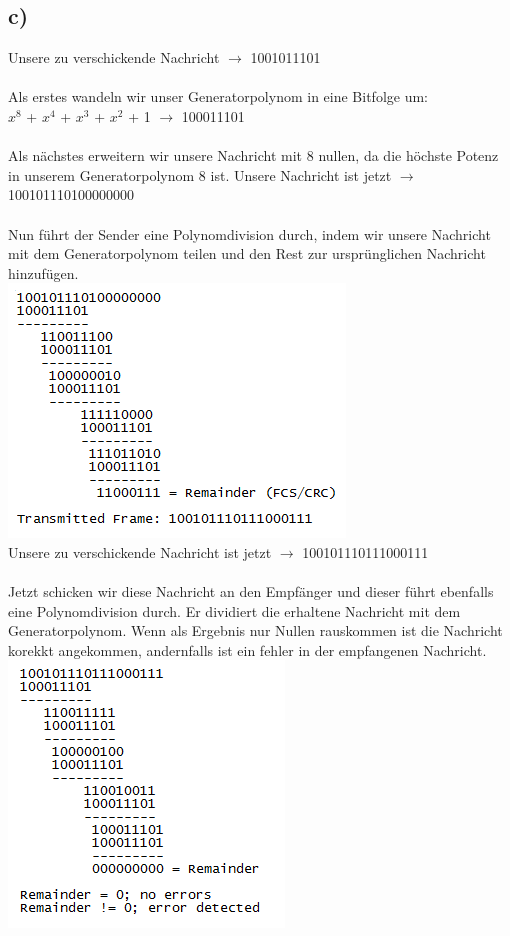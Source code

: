 \documentclass[a4paper,12pt]{scrartcl}
\begin{document}
\subsection{c)}
Unsere zu verschickende Nachricht $\rightarrow$ 1001011101\\\\
Als erstes wandeln wir unser Generatorpolynom in eine Bitfolge um:\\
$x^8$ + $x^4$ + $x^3$ + $x^2$ + 1 $\rightarrow$ 100011101\\\\
Als nächstes erweitern wir unsere Nachricht mit 8 nullen, da die höchste Potenz in unserem Generatorpolynom 8 ist. Unsere Nachricht ist jetzt $\rightarrow$ 100101110100000000\\\\
Nun führt der Sender eine Polynomdivision durch, indem wir unsere Nachricht mit dem Generatorpolynom teilen und den Rest zur ursprünglichen Nachricht hinzufügen.\\
\includegraphics{./images/Aufgabe8c-sender}\\
Unsere zu verschickende Nachricht ist jetzt $\rightarrow$ 100101110111000111\\\\
Jetzt schicken wir diese Nachricht an den Empfänger und dieser führt ebenfalls eine Polynomdivision durch. Er dividiert die erhaltene Nachricht mit dem Generatorpolynom. Wenn als Ergebnis nur Nullen rauskommen ist die Nachricht korekkt angekommen, andernfalls ist ein fehler in der empfangenen Nachricht.\\
\includegraphics{./images/Aufgabe8c-empfaenger}\\
\end{document}
